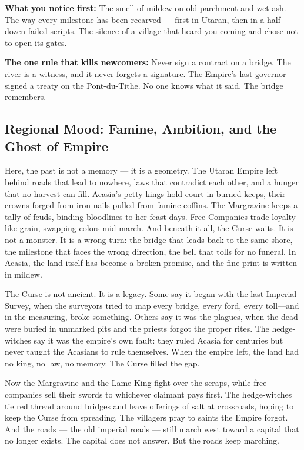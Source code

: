 \begin{tcolorbox}[colback=black!3,colframe=blue!60!black,title={Theme \& Atmosphere},breakable]
\vspace{2mm}
\textbf{What you notice first:} The smell of mildew on old parchment and wet ash. The way every milestone has been recarved --- first in Utaran, then in a half-dozen failed scripts. The silence of a village that heard you coming and chose not to open its gates.

\textbf{The one rule that kills newcomers:} Never sign a contract on a bridge. The river is a witness, and it never forgets a signature. The Empire's last governor signed a treaty on the Pont-du-Tithe. No one knows what it said. The bridge remembers.
\end{tcolorbox}

\subsection*{Regional Mood: Famine, Ambition, and the Ghost of Empire}

Here, the past is not a memory --- it is a geometry. The Utaran Empire left behind roads that lead to nowhere, laws that contradict each other, and a hunger that no harvest can fill. Acasia's petty kings hold court in burned keeps, their crowns forged from iron nails pulled from famine coffins. The Margravine keeps a tally of feuds, binding bloodlines to her feast days. Free Companies trade loyalty like grain, swapping colors mid-march. And beneath it all, the Curse waits. It is not a monster. It is a wrong turn: the bridge that leads back to the same shore, the milestone that faces the wrong direction, the bell that tolls for no funeral. In Acasia, the land itself has become a broken promise, and the fine print is written in mildew.

The Curse is not ancient. It is a legacy. Some say it began with the last Imperial Survey, when the surveyors tried to map every bridge, every ford, every toll---and in the measuring, broke something. Others say it was the plagues, when the dead were buried in unmarked pits and the priests forgot the proper rites. The hedge-witches say it was the empire's own fault: they ruled Acasia for centuries but never taught the Acasians to rule themselves. When the empire left, the land had no king, no law, no memory. The Curse filled the gap.

Now the Margravine and the Lame King fight over the scraps, while free companies sell their swords to whichever claimant pays first. The hedge-witches tie red thread around bridges and leave offerings of salt at crossroads, hoping to keep the Curse from spreading. The villagers pray to saints the Empire forgot. And the roads --- the old imperial roads --- still march west toward a capital that no longer exists. The capital does not answer. But the roads keep marching.

